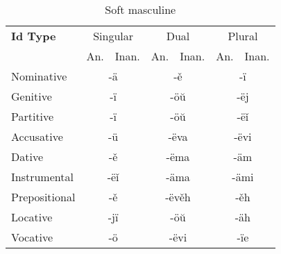 \begin{table}
	\caption{Soft masculine}
	\begin{tabular}{lllllll}
		\textbf{Id Type}       
		& \multicolumn{2}{c}{Singular} 
		& \multicolumn{2}{c}{Dual} 
		& \multicolumn{2}{c}{Plural} \\
		& An.   & Inan.  & An.   & Inan.   & An.  & Inan. \\
		Nominative    & \multicolumn{2}{c}{-ä}      
		& \multicolumn{2}{c}{-ě}        
		& \multicolumn{2}{c}{-ï} \\
		Genitive      & \multicolumn{2}{c}{-ï}       
		& \multicolumn{2}{c}{-öŭ}      
		& \multicolumn{2}{c}{-ëj}   \\
		Partitive     & \multicolumn{2}{c}{-ï}       
		& \multicolumn{2}{c}{-öŭ}      
		& \multicolumn{2}{c}{-ëǐ} \\
		Accusative    & \multicolumn{2}{c}{-ü}       
		& \multicolumn{2}{c}{-ëva}
		& \multicolumn{2}{c}{-ëvi} \\
		Dative        & \multicolumn{2}{c}{-ě}       
		& \multicolumn{2}{c}{-ëma}     
		& \multicolumn{2}{c}{-äm} \\
		Instrumental  & \multicolumn{2}{c}{-ëǐ}     
		& \multicolumn{2}{c}{-äma}     
		& \multicolumn{2}{c}{-ämi} \\
		Prepositional & \multicolumn{2}{c}{-ě}       
		& \multicolumn{2}{c}{-ëvěh}     
		& \multicolumn{2}{c}{-ěh} \\
		Locative      & \multicolumn{2}{c}{-jï}      
		& \multicolumn{2}{c}{-öŭ}       
		& \multicolumn{2}{c}{-äh} \\ 
		Vocative      & \multicolumn{2}{c}{-ö}       
		& \multicolumn{2}{c}{-ëvi}      
		& \multicolumn{2}{c}{-ïe}
	\end{tabular}
\end{table}

